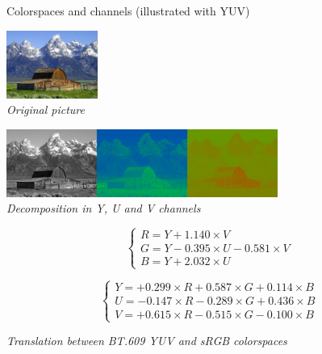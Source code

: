 \begin{frame}{Colorspaces and channels (illustrated with YUV)}
  \begin{minipage}[t]{0.25\textwidth}
    \centering
    \includegraphics[height=6em]{slides/graphics-theory/barn.jpg}\\
    \textit{\small Original picture}
  \end{minipage}
  \hfill
  \begin{minipage}[t]{0.7\textwidth}
    \centering
    \includegraphics[height=6em]{slides/graphics-theory/barn-yuv.jpg}\\
    \textit{\small Decomposition in Y, U and V channels}
  \end{minipage}

  \vspace{1em}

  \begin{minipage}[t]{0.4\textwidth}
    \small
    \begin{equation*}
    \begin{cases}
    R = Y + 1.140 \times V\\
    G = Y - 0.395 \times U - 0.581 \times V\\
    B = Y + 2.032 \times U
    \end{cases}
    \end{equation*}
  \end{minipage}
  \hfill
  \begin{minipage}[t]{0.55\textwidth}
    \small
    \begin{equation*}
    \begin{cases}
    Y = + 0.299 \times R + 0.587 \times G + 0.114 \times B\\
    U = - 0.147 \times R - 0.289 \times G + 0.436 \times B\\
    V = + 0.615 \times R - 0.515 \times G - 0.100 \times B
    \end{cases}
    \end{equation*}
  \end{minipage}

  \begin{center}
     \textit{\small Translation between BT.609 YUV and sRGB colorspaces}
  \end{center}
\end{frame}

